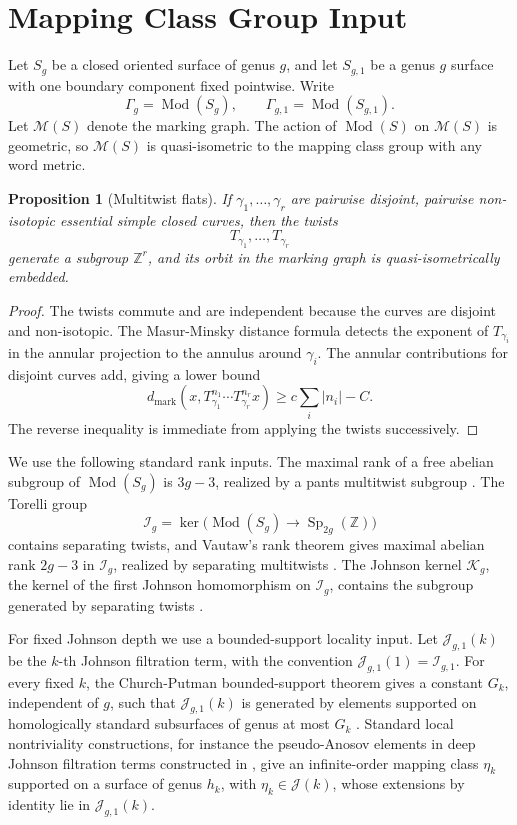 \documentclass[11pt]{article}
\newtheorem{proposition}[theorem]{Proposition}
\DeclareMathOperator{\Mod}{Mod}
\DeclareMathOperator{\Sp}{Sp}
\begin{document}
\section{Mapping Class Group Input}

Let \(S_g\) be a closed oriented surface of genus \(g\), and let \(S_{g,1}\) be
a genus \(g\) surface with one boundary component fixed pointwise.  Write
\[
\Gamma_g=\Mod(S_g),
\qquad
\Gamma_{g,1}=\Mod(S_{g,1}).
\]
Let \(\mathcal M(S)\) denote the marking graph.  The action of \(\Mod(S)\) on
\(\mathcal M(S)\) is geometric, so \(\mathcal M(S)\) is quasi-isometric to the
mapping class group with any word metric.

\begin{proposition}[Multitwist flats]
If \(\gamma_1,\ldots,\gamma_r\) are pairwise disjoint, pairwise non-isotopic
essential simple closed curves, then the twists
\[
T_{\gamma_1},\ldots,T_{\gamma_r}
\]
generate a subgroup \(\mathbb Z^r\), and its orbit in the marking graph is
quasi-isometrically embedded.
\end{proposition}

\begin{proof}
The twists commute and are independent because the curves are disjoint and
non-isotopic.  The Masur-Minsky distance formula detects the exponent of
\(T_{\gamma_i}\) in the annular projection to the annulus around \(\gamma_i\).
The annular contributions for disjoint curves add, giving a lower bound
\[
d_{\mathrm{mark}}\!\left(
x,T_{\gamma_1}^{n_1}\cdots T_{\gamma_r}^{n_r}x
\right)
\ge
c\sum_i |n_i|-C.
\]
The reverse inequality is immediate from applying the twists successively.
\end{proof}

We use the following standard rank inputs.  The maximal rank of a free abelian
subgroup of \(\Mod(S_g)\) is \(3g-3\), realized by a pants multitwist subgroup
\cite{BLM,FLM}.  The Torelli group
\[
\mathcal I_g=\ker\bigl(\Mod(S_g)\to\Sp_{2g}(\mathbb Z)\bigr)
\]
contains separating twists, and Vautaw's rank theorem gives maximal abelian rank
\(2g-3\) in \(\mathcal I_g\), realized by separating multitwists
\cite{Vau}.  The Johnson kernel \(\mathcal K_g\), the kernel of the first
Johnson homomorphism on \(\mathcal I_g\), contains the subgroup generated by
separating twists \cite{Joh,Put}.

For fixed Johnson depth we use a bounded-support locality input.  Let
\(\mathcal J_{g,1}(k)\) be the \(k\)-th Johnson filtration term, with the
convention \(\mathcal J_{g,1}(1)=\mathcal I_{g,1}\).
For every fixed \(k\), the Church-Putman bounded-support theorem gives a
constant \(G_k\), independent of \(g\), such that
\(\mathcal J_{g,1}(k)\) is generated by elements supported on homologically
standard subsurfaces of genus at most \(G_k\) \cite{CP}.  Standard local
nontriviality constructions, for instance the pseudo-Anosov elements in deep
Johnson filtration terms constructed in \cite{MP}, give an infinite-order
mapping class \(\eta_k\) supported on a surface of genus \(h_k\), with
\(\eta_k\in\mathcal J(k)\), whose extensions by identity lie in
\(\mathcal J_{g,1}(k)\).
\end{document}
